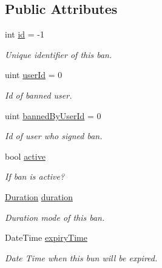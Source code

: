 \subsection*{Public Attributes}
\begin{DoxyCompactItemize}
\item 
int \mbox{\hyperlink{class_authority_controller_1_1_data_1_1_personal_1_1_ban_information_a723ebbe0f1de9d495ddc1415fbe8d58d}{id}} = -\/1
\begin{DoxyCompactList}\small\item\em Unique identifier of this ban. \end{DoxyCompactList}\item 
uint \mbox{\hyperlink{class_authority_controller_1_1_data_1_1_personal_1_1_ban_information_a1a674fa4493f3392a4726854e0316607}{user\+Id}} = 0
\begin{DoxyCompactList}\small\item\em Id of banned user. \end{DoxyCompactList}\item 
uint \mbox{\hyperlink{class_authority_controller_1_1_data_1_1_personal_1_1_ban_information_acdff2dd2a45cde1adf6586e631c99916}{banned\+By\+User\+Id}} = 0
\begin{DoxyCompactList}\small\item\em Id of user who signed ban. \end{DoxyCompactList}\item 
bool \mbox{\hyperlink{class_authority_controller_1_1_data_1_1_personal_1_1_ban_information_a8aa7fea19a5b2acce008883fcda629b2}{active}}
\begin{DoxyCompactList}\small\item\em If ban is active? \end{DoxyCompactList}\item 
\mbox{\hyperlink{class_authority_controller_1_1_data_1_1_personal_1_1_ban_information_a127a28a1db99b43e2540f18949921a7d}{Duration}} \mbox{\hyperlink{class_authority_controller_1_1_data_1_1_personal_1_1_ban_information_a68241c910c08c5659c1fcbc86e9ee8a8}{duration}}
\begin{DoxyCompactList}\small\item\em Duration mode of this ban. \end{DoxyCompactList}\item 
Date\+Time \mbox{\hyperlink{class_authority_controller_1_1_data_1_1_personal_1_1_ban_information_ac999bc7a08b0ac597e37898a74c3d79b}{expiry\+Time}}
\begin{DoxyCompactList}\small\item\em Date Time when this bun will be expired. \end{DoxyCompactList}\item 

\end{DoxyCompactItemize}
